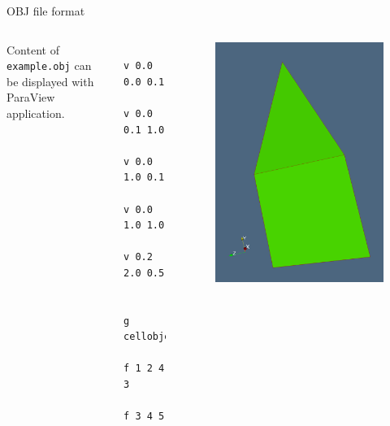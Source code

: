 \begin{frame}[fragile]{OBJ file format}
    \begin{columns}
        Content of \verb+example.obj+ can be displayed with ParaView application.
            \begin{lstlisting}
            v 0.0 0.0 0.1
            v 0.0 0.1 1.0
            v 0.0 1.0 0.1
            v 0.0 1.0 1.0
            v 0.2 2.0 0.5
            
            g cellobject
            f 1 2 4 3
            f 3 4 5
            \end{lstlisting}
            \begin{figure}
                \centering
                \includegraphics[width=\textwidth]{figs/example_obj.png}
            \end{figure}
    \end{columns}
\end{frame}

